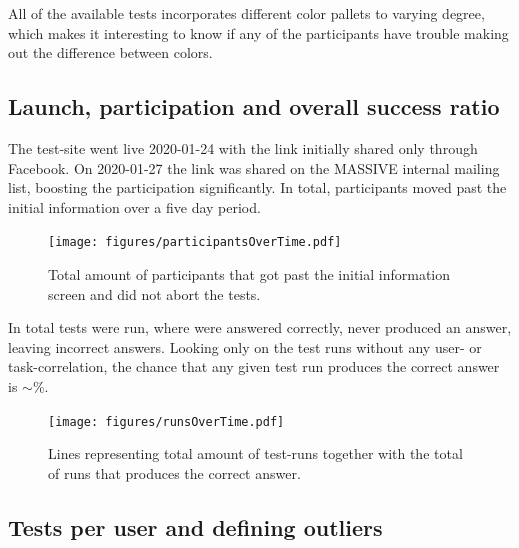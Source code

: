 \documentclass[nofilelist,dvipsnames]{cslthse-msc}
\begin{document}
        All of the available tests incorporates different color pallets to
        varying degree, which makes it interesting to know if any of the
        participants have trouble making out the difference between colors.
        \vspace{-0.6cm}

			\subsection{Launch, participation and overall success ratio}

        The test-site went live 2020-01-24 with the link initially shared only
        through Facebook. On 2020-01-27 the link was shared on the MASSIVE
        internal mailing list, boosting the participation significantly.
        In total,  participants moved past the
        initial information over a five day period.

        \vspace{-0.55cm}
				\begin{figure}[h!]
					\centering
					\texttt{[image: figures/participantsOverTime.pdf]}
          \vspace{-0.3cm}
          \caption{
            Total amount of participants that got past the initial
            information screen and did not abort the tests.
          }
				\end{figure}

				In total  tests were run, where
				 were answered correctly,
				 never produced an answer, leaving
				 incorrect answers. Looking only on the test
				runs without any user- or task-correlation, the chance that any given test run
				produces the correct answer is $\sim$\%.

				\begin{figure}[h!]
					\centering
					\texttt{[image: figures/runsOverTime.pdf]}
          \vspace{-0.3cm}
          \caption{Lines representing total amount of test-runs together with
            the total of runs that produces the correct answer.}
          \vspace{-0.4cm}
				\end{figure}

			\subsection{Tests per user and defining outliers}
\end{document}
